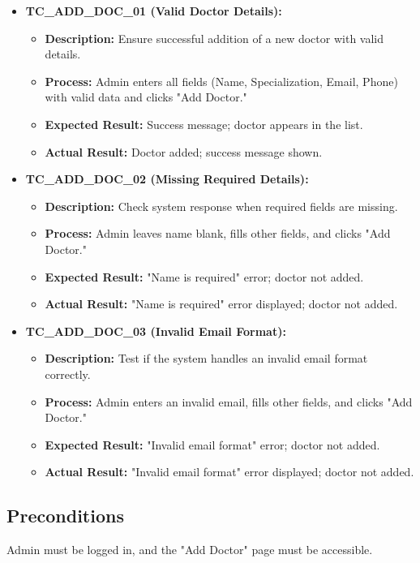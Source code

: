 \documentclass{article}
\begin{document}
\begin{itemize}
    \item \textbf{TC\_ADD\_DOC\_01 (Valid Doctor Details):}
    \begin{itemize}
        \item \textbf{Description:} Ensure successful addition of a new doctor with valid details.
        \item \textbf{Process:} Admin enters all fields (Name, Specialization, Email, Phone) with valid data and clicks "Add Doctor."
        \item \textbf{Expected Result:} Success message; doctor appears in the list.
        \item \textbf{Actual Result:} Doctor added; success message shown.
    \end{itemize}
    \item \textbf{TC\_ADD\_DOC\_02 (Missing Required Details):}
    \begin{itemize}
        \item \textbf{Description:} Check system response when required fields are missing.
        \item \textbf{Process:} Admin leaves name blank, fills other fields, and clicks "Add Doctor."
        \item \textbf{Expected Result:} "Name is required" error; doctor not added.
        \item \textbf{Actual Result:} "Name is required" error displayed; doctor not added.
    \end{itemize}
    \item \textbf{TC\_ADD\_DOC\_03 (Invalid Email Format):}
    \begin{itemize}
        \item \textbf{Description:} Test if the system handles an invalid email format correctly.
        \item \textbf{Process:} Admin enters an invalid email, fills other fields, and clicks "Add Doctor."
        \item \textbf{Expected Result:} "Invalid email format" error; doctor not added.
        \item \textbf{Actual Result:} "Invalid email format" error displayed; doctor not added.
    \end{itemize}
\end{itemize}

\subsection{Preconditions}
Admin must be logged in, and the "Add Doctor" page must be accessible.
\end{document}
